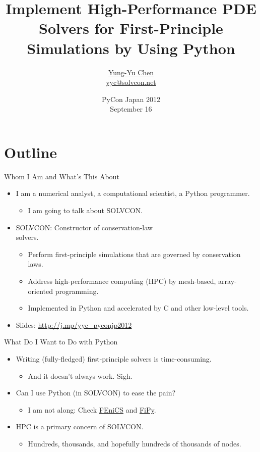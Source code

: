 \documentclass[dvips,xcolor=pst,14pt]{beamer}
\title[SOLVCON: HPC PDE Solvers]{Implement High-Performance PDE Solvers for
First-Principle Simulations by Using Python}
\author[\href{http://solvcon.net/yyc/}{Chen}]%
{\href{http://solvcon.net/yyc/}{Yung-Yu Chen} \\ \url{yyc@solvcon.net}}
\institute[\href{http://solvcon.net/}{SOLVCON}]%
{Developer \\ \href{http://solvcon.net/}{SOLVCON Project}}
\date[2012/9/19]{PyCon Japan 2012 \\ September 16}
\begin{document}
\begin{frame}
\titlepage
\end{frame}

\section*{
Outline
}

\begin{frame}{
%
Whom I Am and What's This About
%
}
\begin{itemize}
  \item I am a numerical analyst, a computational scientist, a Python programmer.
  \begin{itemize}
    \item I am going to talk about \alert{SOLVCON}.
  \end{itemize}
  \item SOLVCON: Constructor of conservation-law \\ solvers.
  \begin{itemize}
    \item Perform first-principle simulations that are governed by conservation
    laws.
    \item Address \alert{high-performance computing (HPC)} by mesh-based,
    array-oriented programming.
    \item Implemented in Python and accelerated by C and other low-level tools.
  \end{itemize}
  \item Slides: \url{http://j.mp/yyc_pyconjp2012}
\end{itemize}
\end{frame}

\begin{frame}{
%
What Do I Want to Do with Python
%
}
\begin{itemize}
  \item Writing (fully-fledged) first-principle solvers is time-consuming.
  \begin{itemize}
    \item And it doesn't always work.  Sigh.
  \end{itemize}
  \item Can I use Python (in SOLVCON) to ease the pain?
  \begin{itemize}
    \item I am not along: Check \href{http://www.fenicsproject.org/}{FEniCS}
    and \href{http://www.ctcms.nist.gov/fipy/}{FiPy}.
  \end{itemize}
  \item \alert{HPC} is a primary concern of SOLVCON.
  \begin{itemize}
    \item Hundreds, thousands, and hopefully hundreds of thousands of nodes.
  \end{itemize}
\end{itemize}
\end{frame}
\end{document}
